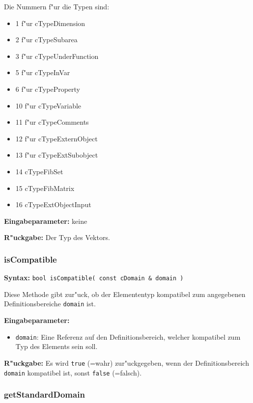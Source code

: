 \bigskip\noindent
Die Nummern f"ur die Typen sind:
\begin{itemize}
 \item 1 f"ur cTypeDimension
 \item 2 f"ur cTypeSubarea
 \item 3 f"ur cTypeUnderFunction
 \item 5 f"ur cTypeInVar
 \item 6 f"ur cTypeProperty
 \item 10 f"ur cTypeVariable
 \item 11 f"ur cTypeComments
 \item 12 f"ur cTypeExternObject
 \item 13 f"ur cTypeExtSubobject
 \item 14 cTypeFibSet
 \item 15 cTypeFibMatrix
 \item 16 cTypeExtObjectInput
\end{itemize}

\bigskip\noindent
\textbf{Eingabeparameter:} keine

\bigskip\noindent
\textbf{R"uckgabe:} Der Typ des Vektors.


\subsubsection{isCompatible}

\textbf{Syntax:} \verb|bool isCompatible( const cDomain & domain )|

\bigskip\noindent
Diese Methode gibt zur"uck, ob der Elemententyp kompatibel zum angegebenen Definitionsbereiche \verb|domain| ist.

\bigskip\noindent
\textbf{Eingabeparameter:}
\begin{itemize}
 \item \verb|domain|: Eine Referenz auf den Definitionsbereich, welcher kompatibel zum Typ des Elements sein soll.
\end{itemize}

\bigskip\noindent
\textbf{R"uckgabe:} Es wird \verb|true| (=wahr) zur"uckgegeben, wenn der Definitionsbereich \verb|domain| kompatibel ist, sonst \verb|false| (=falsch).


\subsubsection{getStandardDomain}

